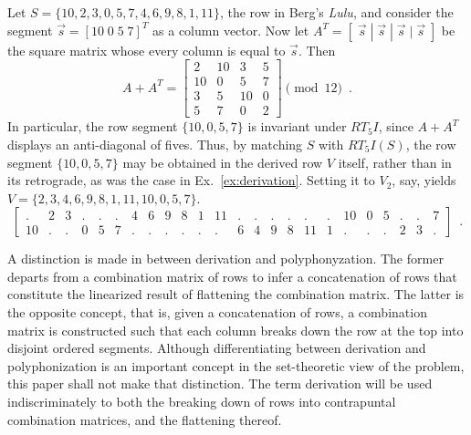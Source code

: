 \begin{example}
    \label{ex:derivation-ordered}
    Let $S = \{ 10, 2, 3, 0, 5, 7, 4, 6, 9, 8, 1, 11 \}$, the row in Berg's \emph{Lulu}, and consider the segment $\vec{s} = [10 \; 0 \; 5 \; 7]^T$ as a column vector. Now let $A^T = [\;\vec{s} \; | \; \vec{s} \; | \; \vec{s} \; | \; \vec{s}\;]$ be the square matrix whose every column is equal to $\vec{s}$. Then
	\begin{equation}
    	A + A^T = \begin{bmatrix}
    		2 & 10 & 3 & 5 \\
        	10 & 0 & 5 & 7 \\
        	3 & 5 & 10 & 0 \\
        	5 & 7 & 0 & 2
        \end{bmatrix} \pmod{12} \enspace.
	\end{equation}
	\noindent In particular, the row segment $\{ 10, 0, 5, 7 \}$ is invariant under $RT_5I$, since $A + A^T$ displays an anti-diagonal of fives. Thus, by matching $S$ with $RT_5I(S)$, the row segment $\{ 10, 0, 5, 7 \}$ may be obtained in the derived row $V$ itself, rather than in its retrograde, as was the case in Ex.~\ref{ex:derivation}. Setting it to $V_2$, say, yields $V = \{ 2, 3, 4, 6, 9, 8, 1, 11, 10, 0, 5, 7 \}$.
	\begin{equation}
    	\left[
    	\begin{array}{cccccccccccc|cccccccccccc}
        	. & 2 & 3 & . & . & . & 4 & 6 & 9 & 8 & 1 & 11 & . & . & . & . & . & . & 10 & 0 & 5 & . & . & 7 \\
        	10 & . & . & 0 & 5 & 7 & . & . & . & . & . & . & 6 & 4 & 9 & 8 & 11 & 1 & . & . & . & 2 & 3 & .
    	\end{array}
    	\right] \enspace.
	\end{equation}
\end{example}

A distinction is made in \cite[211, 214]{Starr1984} between derivation and polyphonyzation. The former departs from a combination matrix of rows to infer a concatenation of rows that constitute the linearized result of flattening the combination matrix. The latter is the opposite concept, that is, given a concatenation of rows, a combination matrix is constructed such that each column breaks down the row at the top into disjoint ordered segments. Although differentiating between derivation and polyphonization is an important concept in the set-theoretic view of the problem, this paper shall not make that distinction. The term derivation will be used indiscriminately to both the breaking down of rows into contrapuntal combination matrices, and the flattening thereof.

